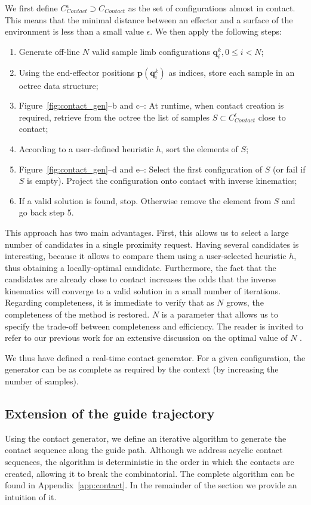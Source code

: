 We first define $C_{Contact}^{\epsilon} \supset C_{Contact}$ as the set of configurations almost in contact. This means that the minimal distance 
between an effector and a surface of the environment is less than a small value $\epsilon$.
We then apply the following steps:
\begin{enumerate}
\item Generate off-line $N$ valid sample limb configurations $\mathbf{q}^k_i,  0 \leq i < N$;
\item Using the end-effector positions $\mathbf{p}(\mathbf{q}^k_i)$ as indices, store each sample in an octree data structure;
\item Figure~\ref{fig:contact_gen}--b and c--: At runtime, when contact creation is required, retrieve from the octree the list of samples $S \subset C_{Contact}^{\epsilon}$ close to contact;
\item According to a user-defined heuristic $h$, sort the elements of $S$;
\item Figure~\ref{fig:contact_gen}--d and e--: Select the first configuration of $S$ (or fail if $S$ is empty). Project the configuration onto contact with inverse kinematics;
\item If a valid solution is found, stop. Otherwise remove the element from $S$ and go back step 5.
\end{enumerate}

This approach has two main advantages.
First, this allows us to select a large number of candidates in a single proximity request.
Having several candidates is interesting, because it allows to compare them using a user-selected heuristic $h$, thus obtaining
a locally-optimal candidate.
Furthermore, the fact that the candidates are already close to contact increases the odds that the inverse kinematics will converge to a valid solution in a small number of iterations.
Regarding completeness, it is immediate to verify that as $N$ grows, the completeness of the method is restored.
$N$ is a parameter that allows us to specify the trade-off between completeness and efficiency.
The reader is invited to refer to our previous work for an extensive discussion on the optimal value of $N$ \citep{Tonneau2014}.

We thus have defined a real-time contact generator. For a given configuration, the generator can be as complete as required by the context (by increasing the number of samples).

\subsection{Extension of the guide trajectory}
Using the contact generator, we define an iterative algorithm to generate the contact
sequence along the guide path.
Although we address acyclic contact sequences, the algorithm is deterministic in the order in which 
the contacts are created, allowing it to break the combinatorial.
The complete algorithm can be found in Appendix~\ref{app:contact}.
In the remainder of the section we provide an intuition of it.

